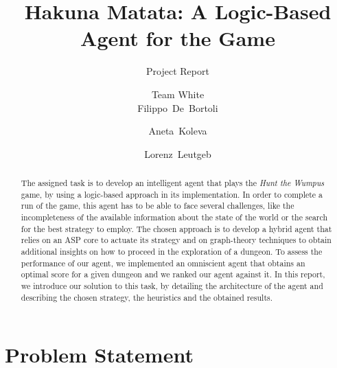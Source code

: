 \documentclass{llncs}
\title{Hakuna Matata: A Logic-Based Agent for the \htw Game}
\subtitle{Project Report}
\author{Team White\\[2mm]Filippo~De~Bortoli \and Aneta~Koleva \and Lorenz~Leutgeb}
\institute{Free University of Bozen-Bolzano\\[3mm] \texttt{\{\href{mailto:filippo.debortoli@stud-inf.unibz.it}{filippo.debortoli},\href{mailto:aneta.koleva@stud-inf.unibz.it}{aneta.koleva},\href{mailto:lorenz.leutgeb@stud-inf.unibz.it}{lorenz.leutgeb}\}\newline @stud-inf.unibz.it}}
\newcommand{\htw}{\emph{Hunt the Wumpus }}
\begin{document}
\maketitle
\thispagestyle{plain}

\begin{abstract}
  The assigned task is to develop an intelligent agent that plays the \htw game, by using a logic-based approach in its implementation.
  In order to complete a run of the game, this agent has to be able to face several challenges, like the incompleteness of the available information about the state of the world or the search for the best strategy to employ.
  The chosen approach is to develop a hybrid agent that relies on an ASP core to actuate its strategy and on graph-theory techniques to obtain additional insights on how to proceed in the exploration of a dungeon.
  To assess the performance of our agent, we implemented an omniscient agent that obtains an optimal score for a given dungeon and we ranked our agent against it.
  In this report, we introduce our solution to this task, by detailing the architecture of the agent and describing the chosen strategy, the heuristics and the obtained results.
\end{abstract}

\section{Problem Statement}
\end{document}
